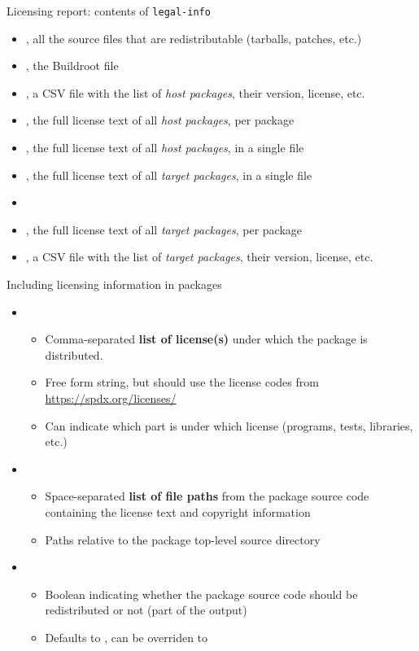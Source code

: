 \begin{frame}{Licensing report: contents of {\tt legal-info}}
  \begin{itemize}
  \item {}, all the source files that are redistributable
    (tarballs, patches, etc.)
  \item {}, the Buildroot  file
  \item {}, a CSV file with the list of {\em
      host packages}, their version, license, etc.
  \item {}, the full license text of all {\em
      host packages}, per package
  \item {}, the full license text of all {\em
      host packages}, in a single file
  \item {}, the full license text of all {\em target
      packages}, in a single file
  \item {}
  \item {}, the full license text of all {\em target
      packages}, per package
  \item {}, a CSV file with the list of {\em target
      packages}, their version, license, etc.
  \end{itemize}
\end{frame}

\begin{frame}{Including licensing information in packages}
  \begin{itemize}
  \item {}
    \begin{itemize}
    \item Comma-separated {\bf list of license(s)} under which the
      package is distributed.
    \item Free form string, but should use the license codes from
      \url{https://spdx.org/licenses/}
    \item Can indicate which part is under which license (programs,
      tests, libraries, etc.)
    \end{itemize}
  \item {}
    \begin{itemize}
    \item Space-separated {\bf list of file paths} from the package
      source code containing the license text and copyright
      information
    \item Paths relative to the package top-level source directory
    \end{itemize}
  \item {}
    \begin{itemize}
    \item Boolean indicating whether the package source code should be
      redistributed or not (part of the  output)
    \item Defaults to , can be overriden to 
    \end{itemize}
  \end{itemize}
\end{frame}

